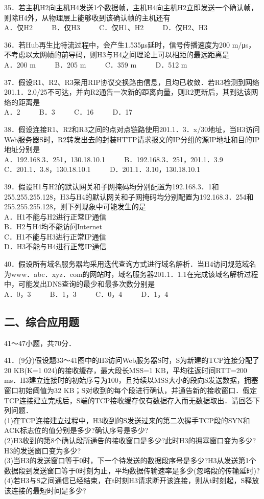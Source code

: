 35．若主机H2向主机H4发送1个数据帧，主机H4向主机H2立即发送一个确认帧，则除H4外，从物理层上能够收到该确认帧的主机还有 \\
A．仅H2 $\qquad$ B．仅H3 $\qquad$ C．仅H1、H2 $\qquad$ D．仅H2、H3

36．若Hub再生比特流过程中，会产生1.535μs延时，信号传播速度为200 m/μs，不考虑以太网帧的前导码，则H3与H4之间理论上可以相距的最远距离是 \\
A．200 m $\qquad$ B．205 m $\qquad$ C．359 m $\qquad$ D．512 m

37．假设R1、R2、R3采用RIP协议交换路由信息，且均已收敛．若R3检测到网络201.1．2.0/25不可达，并向R2通告一次新的距离向量，则R2更新后，其到达该网络的距离是 \\
A．2 $\qquad$ B．3 $\qquad$ C．16 $\qquad$ D．17

38．假设连接R1、R2和R3之间的点对点链路使用201.1．3．x/30地址，当H3访问Web服务器S时，R2转发出去的封装HTTP请求报文的IP分组的源IP地址和目的IP地址分别是 \\
A．192.168.3．251，130.18.10.1 $\qquad$ B．192.168.3．251，201.1．3.9 \\
C．201.1．3.8，130.18.10.1 $\qquad$ D．201.1．3.10，130.18.10.1

39．假设H1与H2的默认网关和子网掩码均分别配置为192.168.3．1和255.255.255.128，H3与H4的默认网关和子网掩码均分别配置为192.168.3．254和255.255.255.128，则下列现象中可能发生的是 \\
A．H1不能与H2进行正常IP通信 \\
B．H2与H4均不能访问Internet \\
C．H1不能与H3进行正常IP通信 \\
D．H3不能与H4进行正常IP通信

40．假设所有域名服务器均采用迭代查询方式进行域名解析．当H4访问规范域名为www．abc．xyz．com的网站时，域名服务器201.1．1.1在完成该域名解析过程中，可能发出DNS查询的最少和最多次数分别是 \\
A．0，3 $\qquad$ B．1，3 $\qquad$ C．0，4 $\qquad$ D．1，4

\subsection{二、综合应用题}

41～47小题，共70分．

41．(9分)假设题33～41图中的H3访问Web服务器S时，S为新建的TCP连接分配了20 KB(K=1 024)的接收缓存，最大段长MSS=1 KB，平均往返时间RTT=200 ms．H3建立连接时的初始序号为100，且持续以MSS大小的段向S发送数据，拥塞窗口初始阈值为32 KB；S对收到的每个段进行确认，并通告新的接收窗口．假定TCP连接建立完成后，S端的TCP接收缓存仅有数据存入而无数据取出．请回答下列问题． \\
(1)在TCP连接建立过程中，H3收到的S发送过来的第二次握手TCP段的SYN和ACK标志位的值分别是多少?确认序号是多少? \\
(2)H3收到的第8个确认段所通告的接收窗口是多少?此时H3的拥塞窗口变为多少?H3的发送窗口变为多少? \\
(3)当H3的发送窗口等于0时，下一个待发送的数据段序号是多少?H3从发送第1个数据段到发送窗口等于0时刻为止，平均数据传输速率是多少(忽略段的传输延时)? \\
(4)若H3与S之间通信已经结束，在t时刻H3请求断开该连接，则从t时刻起，S释放该连接的最短时间是多少?

